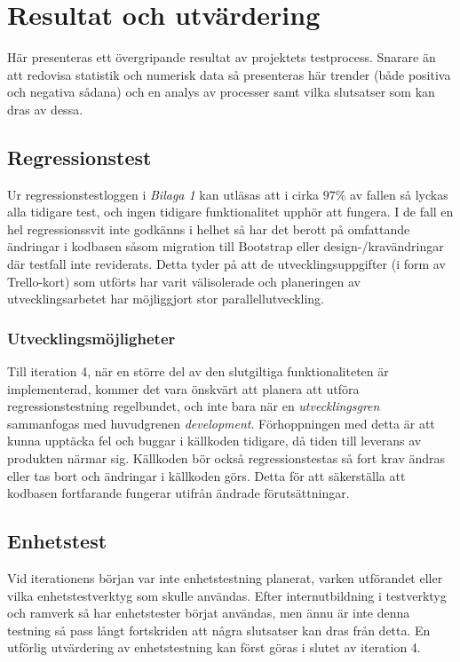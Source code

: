 \section{Resultat och utvärdering}
Här presenteras ett övergripande resultat av projektets testprocess. Snarare än att redovisa statistik och numerisk data så presenteras här trender (både positiva och negativa sådana) och en analys av processer samt vilka slutsatser som kan dras av dessa.

\subsection{Regressionstest}
Ur regressionstestloggen i \textit{Bilaga 1} kan utläsas att i cirka $97\%$ av fallen så lyckas alla tidigare test, och ingen tidigare funktionalitet upphör att fungera. I de fall en hel regressionssvit inte godkänns i helhet så har det berott på omfattande ändringar i kodbasen såsom migration till Bootstrap eller design-/kravändringar där testfall inte reviderats. Detta tyder på att de utvecklingsuppgifter (i form av Trello-kort) som utförts har varit välisolerade och planeringen av utvecklingsarbetet har möjliggjort stor parallellutveckling.
\subsubsection{Utvecklingsmöjligheter}
Till iteration 4, när en större del av den slutgiltiga funktionaliteten är implementerad, kommer det vara önskvärt att planera att utföra regressionstestning regelbundet, och inte bara när en \textit{utvecklingsgren} sammanfogas med huvudgrenen \textit{development}. Förhoppningen med detta är att kunna upptäcka fel och buggar i källkoden tidigare, då tiden till leverans av produkten närmar sig. Källkoden bör också regressionstestas så fort krav ändras eller tas bort och ändringar i källkoden görs. Detta för att säkerställa att kodbasen fortfarande fungerar utifrån ändrade förutsättningar. 

\subsection{Enhetstest}
Vid iterationens början var inte enhetstestning planerat, varken utförandet eller vilka enhetstestverktyg som skulle användas. Efter internutbildning i testverktyg och ramverk så har enhetstester börjat användas, men ännu är inte denna testning så pass långt fortskriden att några slutsatser kan dras från detta. En utförlig utvärdering av enhetstestning kan först göras i slutet av iteration 4. 
